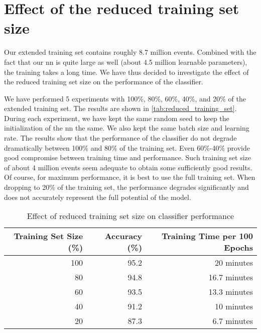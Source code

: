 \section{Effect of the reduced training set size}

Our extended training set contains roughly 8.7 million events. Combined with the fact that our \gls{nn} is quite large
as well (about 4.5 million learnable parameters), the training takes a long time. We have thus decided to investigate
the effect of the reduced training set size on the performance of the classifier.

We have performed 5 experiments with 100\%, 80\%, 60\%, 40\%, and 20\% of the extended training set. The results are
shown in \autoref{tab:reduced_training_set}. During each experiment, we have kept the same random seed to keep the
initialization of the \gls{nn} the same. We also kept the same batch size and learning rate. The results show that the
performance of the classifier do not degrade dramatically between 100\% and 80\% of the training set. Even 60\%-40\%
provide good compromise between training time and performance. Such training set size of about 4 million events seem
adequate to obtain some sufficiently good results. Of course, for maximum performance, it is best to use the full
training set. When dropping to 20\% of the training set, the performance degrades significantly and does not accurately
represent the full potential of the model.

\begin{table}[htbp]
    \centering
    \begin{tabular}{rrr}
        \toprule
        \textbf{Training Set Size (\%)} & \textbf{Accuracy (\%)} & \textbf{Training Time per 100 Epochs} \\
        \midrule
        100                             & 95.2                   & 20 minutes                            \\
        80                              & 94.8                   & 16.7 minutes                          \\
        60                              & 93.5                   & 13.3 minutes                          \\
        40                              & 91.2                   & 10 minutes                            \\
        20                              & 87.3                   & 6.7 minutes                           \\
        \bottomrule
    \end{tabular}
    \caption{Effect of reduced training set size on classifier performance}
    \label{tab:reduced_training_set}
\end{table}
